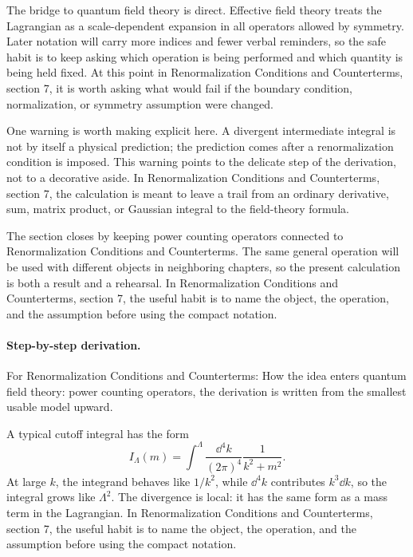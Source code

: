 The bridge to quantum field theory is direct.  Effective field theory treats the Lagrangian as a scale-dependent expansion in all operators allowed by symmetry.  Later notation will carry more indices and fewer verbal reminders, so the safe habit is to keep asking which operation is being performed and which quantity is being held fixed.  At this point in Renormalization Conditions and Counterterms, section 7, it is worth asking what would fail if the boundary condition, normalization, or symmetry assumption were changed.

One warning is worth making explicit here.  A divergent intermediate integral is not by itself a physical prediction; the prediction comes after a renormalization condition is imposed.  This warning points to the delicate step of the derivation, not to a decorative aside.  In Renormalization Conditions and Counterterms, section 7, the calculation is meant to leave a trail from an ordinary derivative, sum, matrix product, or Gaussian integral to the field-theory formula.

The section closes by keeping power counting operators connected to Renormalization Conditions and Counterterms.  The same general operation will be used with different objects in neighboring chapters, so the present calculation is both a result and a rehearsal.  In Renormalization Conditions and Counterterms, section 7, the useful habit is to name the object, the operation, and the assumption before using the compact notation.



\paragraph{Step-by-step derivation.}

For Renormalization Conditions and Counterterms: How the idea enters quantum field theory: power counting operators, the derivation is written from the smallest usable model upward.

A typical cutoff integral has the form
\[
  I_\Lambda(m)=\int^{\Lambda}\frac{\dd^4k}{(2\pi)^4}\frac{1}{k^2+m^2}.
\]
At large \(k\), the integrand behaves like \(1/k^2\), while \(\dd^4k\) contributes \(k^3\dd k\), so the integral grows like \(\Lambda^2\).  The divergence is local: it has the same form as a mass term in the Lagrangian.  In Renormalization Conditions and Counterterms, section 7, the useful habit is to name the object, the operation, and the assumption before using the compact notation.

